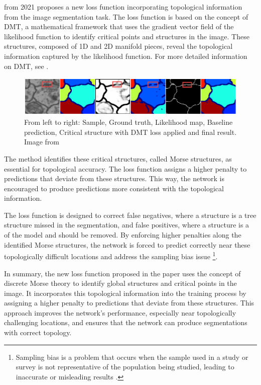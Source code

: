  \cite{hu2021topologyaware} from 2021 proposes a new loss function incorporating topological information from the image segmentation task. The loss function is based on the concept of \ac{DMT}, a mathematical framework that uses the gradient vector field of the likelihood function to identify critical points and structures in the image. These structures, composed of 1D and 2D manifold pieces, reveal the topological information captured by the likelihood function. For more detailed information on \ac{DMT}, see .

\begin{figure}[H]%
    \centering
    \includegraphics[width=\imgWidthXL]{images/morse_theory.png}
    \caption[\acf{DMT} predictions]{From left to right: Sample, Ground truth, Likelihood map, Baseline prediction, Critical structure with \ac{DMT} loss applied and final result. Image from \cite{hu2021topologyaware}}
    \label{morse_theory}
\end{figure}

The method identifies these critical structures, called Morse structures, as essential for topological accuracy. The loss function assigns a higher penalty to predictions that deviate from these structures. This way, the network is encouraged to produce predictions more consistent with the topological information.

The loss function is designed to correct false negatives, where a structure is a tree structure missed in the segmentation, and false positives, where a structure is a  of the model and should be removed. By enforcing higher penalties along the identified Morse structures, the network is forced to predict correctly near these topologically difficult locations and address the sampling bias issue \footnote{Sampling bias is a problem that occurs when the sample used in a study or survey is not representative of the population being studied, leading to inaccurate or misleading results \cite{10.1145/3457607}.}.

In summary, the new loss function proposed in the paper uses the concept of discrete Morse theory to identify global structures and critical points in the image. It incorporates this topological information into the training process by assigning a higher penalty to predictions that deviate from these structures. This approach improves the network's performance, especially near topologically challenging locations, and ensures that the network can produce segmentations with correct topology.

